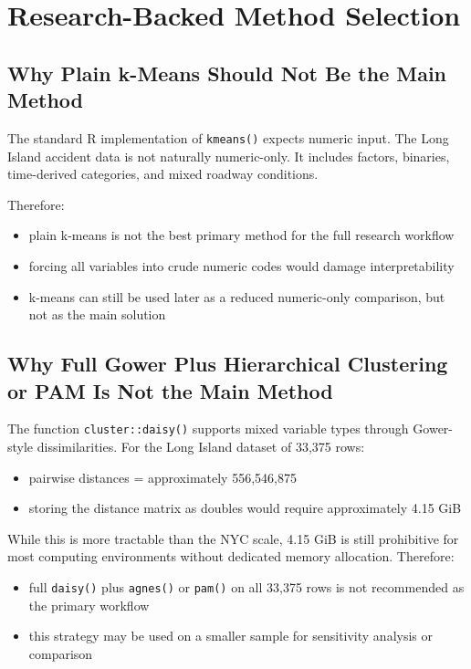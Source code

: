 \documentclass[11pt]{article}
\begin{document}
\section{Research-Backed Method Selection}

\subsection{Why Plain k-Means Should Not Be the Main Method}

The standard R implementation of \texttt{kmeans()} expects numeric input. The Long Island accident data is not naturally numeric-only. It includes factors, binaries, time-derived categories, and mixed roadway conditions.

Therefore:

\begin{itemize}
\item plain k-means is not the best primary method for the full research workflow
\item forcing all variables into crude numeric codes would damage interpretability
\item k-means can still be used later as a reduced numeric-only comparison, but not as the main solution
\end{itemize}

\subsection{Why Full Gower Plus Hierarchical Clustering or PAM Is Not the Main Method}

The function \texttt{cluster::daisy()} supports mixed variable types through Gower-style dissimilarities. For the Long Island dataset of 33,375 rows:

\begin{itemize}
\item pairwise distances = approximately 556,546,875
\item storing the distance matrix as doubles would require approximately 4.15 GiB
\end{itemize}

While this is more tractable than the NYC scale, 4.15 GiB is still prohibitive for most computing environments without dedicated memory allocation. Therefore:

\begin{itemize}
\item full \texttt{daisy()} plus \texttt{agnes()} or \texttt{pam()} on all 33,375 rows is not recommended as the primary workflow
\item this strategy may be used on a smaller sample for sensitivity analysis or comparison
\end{itemize}
\end{document}
